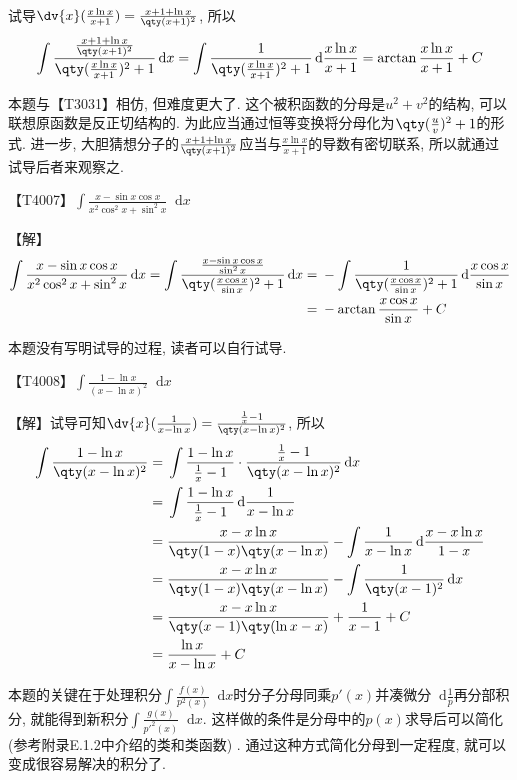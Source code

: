 \documentclass{ctexbook}
\newcommand*{\dif}{\mathop{}\!\mathrm{d}}
\begin{document}
{\begin{align*}
\end{align*}
试导$\dv{x}(\frac{x\ln{x}}{x+1})=\frac{x+1+\ln{x}}{\qty(x+1)^{2}}$, 所以
\begin{align*}
\int\frac{\frac{x+1+\ln{x}}{\qty(x+1)^{2}}}{\qty(\frac{x\ln{x}}{x+1})^{2}+1}\dif{x}=\int\frac{1}{\qty(\frac{x\ln{x}}{x+1})^{2}+1}\dif{\frac{x\ln{x}}{x+1}}=\arctan{\frac{x\ln{x}}{x+1}}+C
\end{align*}\par
{\kaishu 本题与{\color{red}【T3031】}相仿, 但难度更大了. 这个被积函数的分母是$u^{2}+v^{2}$的结构, 可以联想原函数是反正切结构的. 为此应当通过恒等变换将分母化为$\qty(\frac{u}{v})^{2}+1$的形式. 进一步, 大胆猜想分子的$\frac{x+1+\ln{x}}{\qty(x+1)^{2}}$应当与$\frac{x\ln{x}}{x+1}$的导数有密切联系, 所以就通过试导后者来观察之. \par}
【T4007】$\int\frac{x-\sin{x}\cos{x}}{x^{2}\cos^{2}{x}+\sin^{2}{x}}\dif{x}$\par
【解】
\begin{align*}
\int\frac{x-\sin{x}\cos{x}}{x^{2}\cos^{2}{x}+\sin^{2}{x}}\dif{x}=\int\frac{\frac{x-\sin{x}\cos{x}}{\sin^{2}{x}}}{\qty(\frac{x\cos{x}}{\sin{x}})^{2}+1}\dif{x}={}&-\int\frac{1}{\qty(\frac{x\cos{x}}{\sin{x}})^{2}+1}\dif{\frac{x\cos{x}}{\sin{x}}}\\
={}&-\arctan{\frac{x\cos{x}}{\sin{x}}}+C
\end{align*}\par
{\kaishu 本题没有写明试导的过程, 读者可以自行试导. \par}
【T4008】$\int\frac{1-\ln{x}}{\left(x-\ln{x}\right)^{2}}\dif{x}$\par
【解】试导可知$\dv{x}(\frac{1}{x-\ln{x}})=\frac{\frac{1}{x}-1}{\qty(x-\ln{x})^{2}}$, 所以
\begin{align*}
\int\frac{1-\ln{x}}{\qty(x-\ln{x})^{2}}={}&\int\frac{1-\ln{x}}{\frac{1}{x}-1}\cdot\frac{\frac{1}{x}-1}{\qty(x-\ln{x})^{2}}\dif{x}\\
={}&\int\frac{1-\ln{x}}{\frac{1}{x}-1}\dif{\frac{1}{x-\ln{x}}}\\
={}&\frac{x-x\ln{x}}{\qty(1-x)\qty(x-\ln{x})}-\int\frac{1}{x-\ln{x}}\dif{\frac{x-x\ln{x}}{1-x}}\\
={}&\frac{x-x\ln{x}}{\qty(1-x)\qty(x-\ln{x})}-\int\frac{1}{\qty(x-1)^{2}}\dif{x}\\
={}&\frac{x-x\ln{x}}{\qty(x-1)\qty(\ln{x}-x)}+\frac{1}{x-1}+C\\
={}&\frac{\ln{x}}{x-\ln{x}}+C
\end{align*}\par
{\kaishu 本题的关键在于处理积分$\int\frac{f(x)}{p^{2}(x)}\dif{x}$时分子分母同乘$p'(x)$并凑微分$\dif{\frac{1}{p}}$再分部积分, 就能得到新积分$\int\frac{g(x)}{p'^{2}(x)}\dif{x}$. 这样做的条件是分母中的$p(x)$求导后可以简化 (参考附录E.1.2中介绍的\uppercase\expandafter{}类和\uppercase\expandafter{}类函数) . 通过这种方式简化分母到一定程度, 就可以变成很容易解决的积分了. \par
}}
\end{document}
